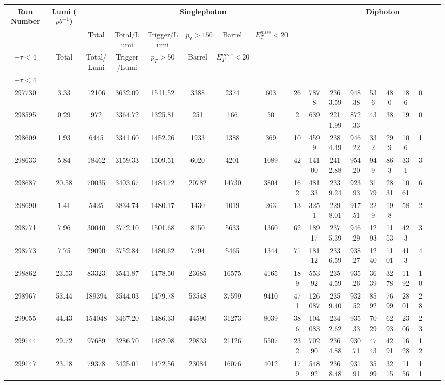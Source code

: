 \documentclass[10pt]{extarticle}
\begin{document}
\begin{longtable}{|c|c|c|c|c|c|c|c|c|c|c|c|c|c|c|c|c|c|}
\hline 
Run Number & Lumi ($pb^{-1}$) & \multicolumn{8}{|c|}{Singlephoton} & \multicolumn{8}{|c|}{Diphoton} \\ 
\hline 
 & & Total & Total/Lumi & Trigger/Lumi & $p_{T} > 150$ & Barrel & $E_{T}^{miss} < 20$ & \begin{tabular}{@{}c@{}} $E_{T}^{miss} > 75$ \\ $+ \tau < 4$ \end{tabular} & Total & Total/Lumi & Trigger/Lumi & $p_{T} > 50$ & Barrel & $E_{T}^{miss} < 20$ & \begin{tabular}{@{}c@{}} $E_{T}^{miss} > 75$ \\ $+ \tau < 4$ \end{tabular} \\ 
\hline 
297730&3.33&12106&3632.09&1511.52&3388&2374&603&26&7878&2363.59&948.38&536&480&186&0 \\ 
\hline 
298595&0.29&972&3364.72&1325.81&251&166&50&2&639&2211.99&872.33&43&38&19&0 \\ 
\hline 
298609&1.93&6445&3341.60&1452.26&1933&1388&369&10&4599&2384.49&946.22&332&299&106&1 \\ 
\hline 
298633&5.84&18462&3159.33&1509.51&6020&4201&1089&42&14100&2412.88&954.20&949&863&331&3 \\ 
\hline 
298687&20.58&70035&3403.67&1484.72&20782&14730&3804&162&48133&2339.24&923.93&3179&2831&1061&6 \\ 
\hline 
298690&1.41&5425&3834.74&1480.17&1430&1019&263&13&3251&2298.01&917.51&229&198&58&2 \\ 
\hline 
298771&7.96&30040&3772.10&1501.68&8150&5633&1360&62&18917&2375.39&946.29&1293&1153&423&3 \\ 
\hline 
298773&7.75&29090&3752.84&1480.62&7794&5465&1344&71&18112&2336.59&938.27&1240&1101&413&4 \\ 
\hline 
298862&23.53&83323&3541.87&1478.50&23685&16575&4165&189&55392&2354.59&935.26&3639&3278&1192&10 \\ 
\hline 
298967&53.44&189394&3544.03&1479.78&53548&37599&9410&471&126087&2359.40&932.52&8592&7699&2801&28 \\ 
\hline 
299055&44.43&154048&3467.20&1486.33&44590&31273&8039&386&104083&2342.62&935.33&7029&6293&2306&23 \\ 
\hline 
299144&29.72&97689&3286.70&1482.08&29833&21126&5507&232&70290&2364.88&930.71&4743&4291&1628&12 \\ 
\hline 
299147&23.18&79378&3425.01&1472.56&23084&16076&4012&179&54892&2368.48&931.91&3599&3215&1156&11 \\ 

\end{longtable}
\end{document}

